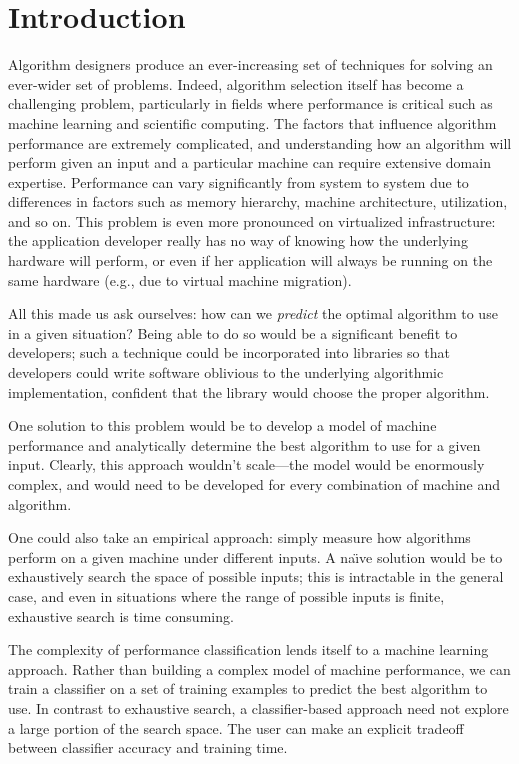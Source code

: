 \section{Introduction}
\label{s:intro}

Algorithm designers produce an ever-increasing set of techniques for solving an ever-wider set of problems.
Indeed, algorithm selection itself has become a challenging problem, particularly in fields where performance is critical such as machine learning and scientific computing.
The factors that influence algorithm performance are extremely complicated, and understanding how an algorithm will perform given an input and a particular machine can require extensive domain expertise.
Performance can vary significantly from system to system due to differences in factors such as memory hierarchy, machine architecture, utilization, and so on.
This problem is even more pronounced on virtualized infrastructure: the application developer really has no way of knowing how the underlying hardware will perform, or even if her application will always be running on the same hardware (e.g., due to virtual machine migration).

All this made us ask ourselves: how can we \emph{predict} the optimal algorithm to use in a given situation?
Being able to do so would be a significant benefit to developers; such a technique could be incorporated into libraries so that developers could write software oblivious to the underlying algorithmic implementation, confident that the library would choose the proper algorithm.

One solution to this problem would be to develop a model of machine performance and analytically determine the best algorithm to use for a given input.
Clearly, this approach wouldn't scale---the model would be enormously complex, and would need to be developed for every combination of machine and algorithm.

One could also take an empirical approach: simply measure how algorithms perform on a given machine under different inputs.
A na\"{\i}ve solution would be to exhaustively search the space of possible inputs; this is intractable in the general case, and even in situations where the range of possible inputs is finite, exhaustive search is time consuming.

The complexity of performance classification lends itself to a machine learning approach.
Rather than building a complex model of machine performance, we can train a classifier on a set of training examples to predict the best algorithm to use.
In contrast to exhaustive search, a classifier-based approach need not explore a large portion of the search space.
The user can make an explicit tradeoff between classifier accuracy and training time.

